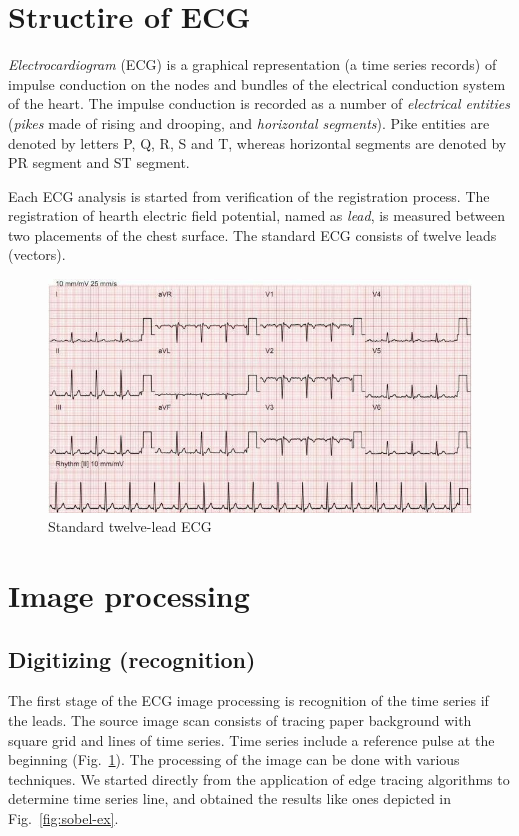 \documentclass[runningheads]{AIIT}
\begin{document}
\section{Structire of ECG}
\label{sec:structire-ecg}

\emph{Electrocardiogram} (ECG) is a graphical representation (a time series records) of impulse conduction on the nodes and bundles of the electrical conduction system of the heart.  The impulse conduction is recorded as a number of \emph{electrical entities} \cite{wikipedia} (\emph{pikes} made of rising and drooping, and \emph{horizontal segments}).  Pike entities are denoted by letters P, Q, R, S and T, whereas horizontal segments are denoted by PR segment and ST segment.

Each ECG analysis is started from verification of the registration process.  The registration of hearth electric field potential, named as \emph{lead}, is measured between two placements of the chest surface.  The standard ECG consists of twelve leads (vectors).

\begin{figure}[htb]
  \centering
    \includegraphics[width=0.5\linewidth]{images/Stand_ECG.jpg}
  \caption{Standard twelve-lead ECG}
  \label{fig:leads-ex}
\end{figure}

\section{Image processing}
\label{sec:image-processing}

\subsection{Digitizing (recognition)}
\label{sec:digit-recogn}

The first stage of the ECG image processing is recognition of the time series if the leads.  The source image scan consists of tracing paper background with square grid and lines of time series.  Time series include a reference pulse at the beginning (Fig.~\ref{fig:leads-ex}).  The processing of the image can be done with various techniques.  We started directly from the application of edge tracing algorithms to determine time series line, and obtained the results like ones depicted in Fig.~\ref{fig:sobel-ex}.
\end{document}
